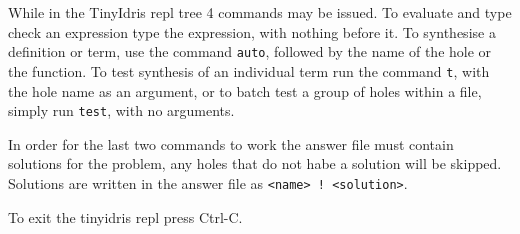 \documentclass[a4paper]{article}
\begin{document}
While in the TinyIdris repl tree 4 commands may be issued. To evaluate
and type check an expression type the expression, with nothing before
it. To synthesise a definition or term, use the command \texttt{auto},
followed by the name of the hole or the function.
To test synthesis of an individual term run the command \texttt{t},
with the hole name as an argument, or to batch test a group of holes
within a file, simply run \texttt{test}, with no arguments.

In order for the last two commands to work the answer file must contain
solutions for the problem, any holes that do not habe a solution will
be skipped. Solutions are written in the answer file as
\texttt{<name> ! <solution>}.

To exit the tinyidris repl press Ctrl-C.
\end{document}
